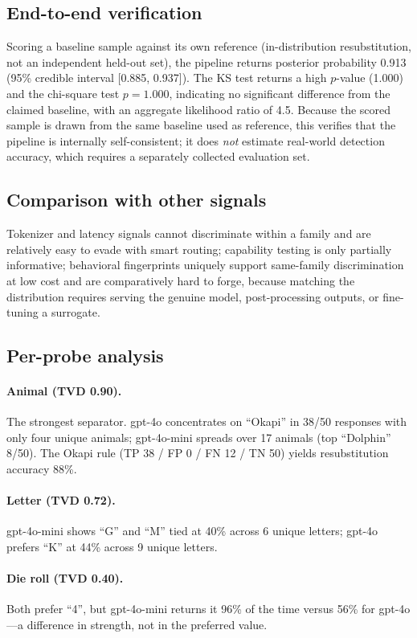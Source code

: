 \documentclass[11pt]{article}
\begin{document}
\subsection{End-to-end verification}
\label{sec:e2e}

Scoring a baseline sample against its own reference (in-distribution resubstitution, not an independent held-out set), the pipeline returns posterior probability 0.913 (95\% credible interval [0.885, 0.937]). The KS test returns a high $p$-value (1.000) and the chi-square test $p=1.000$, indicating no significant difference from the claimed baseline, with an aggregate likelihood ratio of 4.5. Because the scored sample is drawn from the same baseline used as reference, this verifies that the pipeline is internally self-consistent; it does \emph{not} estimate real-world detection accuracy, which requires a separately collected evaluation set.

\subsection{Comparison with other signals}
Tokenizer and latency signals cannot discriminate within a family and are relatively easy to evade with smart routing; capability testing is only partially informative; behavioral fingerprints uniquely support same-family discrimination at low cost and are comparatively hard to forge, because matching the distribution requires serving the genuine model, post-processing outputs, or fine-tuning a surrogate.

\subsection{Per-probe analysis}
\paragraph{Animal (TVD 0.90).} The strongest separator. gpt-4o concentrates on ``Okapi'' in 38/50 responses with only four unique animals; gpt-4o-mini spreads over 17 animals (top ``Dolphin'' 8/50). The Okapi rule (TP 38 / FP 0 / FN 12 / TN 50) yields resubstitution accuracy 88\%.
\paragraph{Letter (TVD 0.72).} gpt-4o-mini shows ``G'' and ``M'' tied at 40\% across 6 unique letters; gpt-4o prefers ``K'' at 44\% across 9 unique letters.
\paragraph{Die roll (TVD 0.40).} Both prefer ``4'', but gpt-4o-mini returns it 96\% of the time versus 56\% for gpt-4o---a difference in strength, not in the preferred value.
\end{document}
